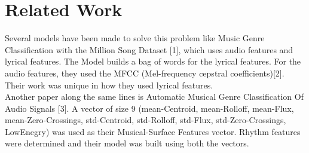 \documentclass[conference]{IEEEtran}
\begin{document}



                    \section{Related Work}
                    Several models have been made to solve this problem like Music Genre Classification with the Million Song Dataset [1], which uses audio features and lyrical features. The Model builds a bag of words for the lyrical features. For the audio features, they used the MFCC (Mel-frequency cepstral coefficients)[2]. Their work was unique in how they used lyrical features.
                    \\
                        Another paper along the same lines is Automatic Musical Genre Classification Of Audio Signals [3]. A vector of size 9 (mean-Centroid, mean-Rolloff, mean-Flux, mean-Zero-Crossings, std-Centroid, std-Rolloff, std-Flux, std-Zero-Crossings, LowEnegry) was used as their Musical-Surface Features vector. Rhythm features were determined and their model was built using both the vectors.
\end{document}
